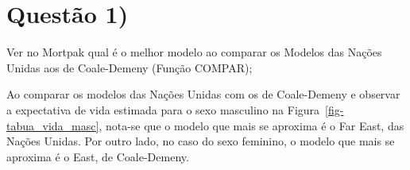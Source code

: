 \documentclass[
  12pt,
  a4paper,
]{scrreprt}
\begin{document}
\section{Questão 1)}\label{questuxe3o-1}

Ver no Mortpak qual é o melhor modelo ao comparar os Modelos das Nações
Unidas aos de Coale-Demeny (Função COMPAR);

\vspace{12pt}

Ao comparar os modelos das Nações Unidas com os de Coale-Demeny e
observar a expectativa de vida estimada para o sexo masculino na
Figura~\ref{fig-tabua_vida_masc}, nota-se que o modelo que mais se
aproxima é o Far East, das Nações Unidas. Por outro lado, no caso do
sexo feminino, o modelo que mais se aproxima é o East, de Coale-Demeny.
\end{document}
